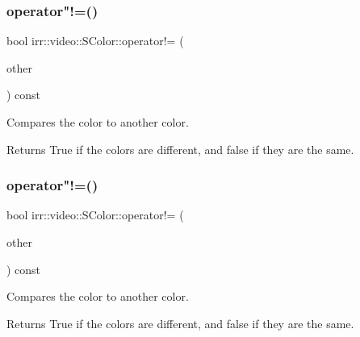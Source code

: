\subsubsection{\texorpdfstring{operator"!=()}{operator!=()}\hspace{0.1cm}{\footnotesize\ttfamily [1/2]}}
{\footnotesize\ttfamily bool irr\+::video\+::\+S\+Color\+::operator!= (\begin{DoxyParamCaption}\item[{const \hyperlink{classirr_1_1video_1_1SColor}{S\+Color} \&}]{other }\end{DoxyParamCaption}) const\hspace{0.3cm}{\ttfamily [inline]}}



Compares the color to another color. 

\begin{DoxyReturn}{Returns}
True if the colors are different, and false if they are the same. 
\end{DoxyReturn}
\mbox{\label{classirr_1_1video_1_1SColor_a2d82eec01be437076044d2330fa80322}} 
\subsubsection{\texorpdfstring{operator"!=()}{operator!=()}\hspace{0.1cm}{\footnotesize\ttfamily [2/2]}}
{\footnotesize\ttfamily bool irr\+::video\+::\+S\+Color\+::operator!= (\begin{DoxyParamCaption}\item[{const \hyperlink{classirr_1_1video_1_1SColor}{S\+Color} \&}]{other }\end{DoxyParamCaption}) const\hspace{0.3cm}{\ttfamily [inline]}}



Compares the color to another color. 

\begin{DoxyReturn}{Returns}
True if the colors are different, and false if they are the same. 
\end{DoxyReturn}
\mbox{\label{classirr_1_1video_1_1SColor_a3de50f1cde7bf3f5b1af79c64cd0cdbd}} 
